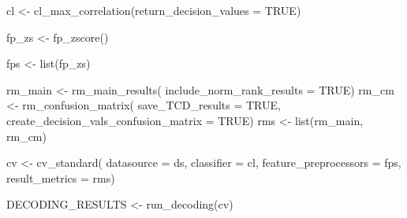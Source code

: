 \documentclass[
]{article}
\newenvironment{Shaded}{\begin{snugshade}}{\end{snugshade}}
\newcommand{\AttributeTok}[1]{\textcolor[rgb]{0.77,0.63,0.00}{#1}}
\newcommand{\ConstantTok}[1]{\textcolor[rgb]{0.00,0.00,0.00}{#1}}
\newcommand{\FunctionTok}[1]{\textcolor[rgb]{0.00,0.00,0.00}{#1}}
\newcommand{\NormalTok}[1]{#1}
\newcommand{\OtherTok}[1]{\textcolor[rgb]{0.56,0.35,0.01}{#1}}
\begin{document}
\begin{Shaded}
\begin{Highlighting}[]
\NormalTok{cl }\OtherTok{\textless{}{-}} \FunctionTok{cl\_max\_correlation}\NormalTok{(}\AttributeTok{return\_decision\_values =} \ConstantTok{TRUE}\NormalTok{) }


\NormalTok{fp\_zs }\OtherTok{\textless{}{-}} \FunctionTok{fp\_zscore}\NormalTok{()}

\NormalTok{fps }\OtherTok{\textless{}{-}} \FunctionTok{list}\NormalTok{(fp\_zs) }


\NormalTok{rm\_main }\OtherTok{\textless{}{-}} \FunctionTok{rm\_main\_results}\NormalTok{(}
     \AttributeTok{include\_norm\_rank\_results =} \ConstantTok{TRUE}\NormalTok{)}
\NormalTok{rm\_cm }\OtherTok{\textless{}{-}} \FunctionTok{rm\_confusion\_matrix}\NormalTok{(}
     \AttributeTok{save\_TCD\_results =} \ConstantTok{TRUE}\NormalTok{,}
     \AttributeTok{create\_decision\_vals\_confusion\_matrix =} \ConstantTok{TRUE}\NormalTok{)}
\NormalTok{rms }\OtherTok{\textless{}{-}} \FunctionTok{list}\NormalTok{(rm\_main, rm\_cm)}


\NormalTok{cv }\OtherTok{\textless{}{-}} \FunctionTok{cv\_standard}\NormalTok{(}
     \AttributeTok{datasource =}\NormalTok{ ds,}
     \AttributeTok{classifier =}\NormalTok{ cl, }
     \AttributeTok{feature\_preprocessors =}\NormalTok{ fps,}
     \AttributeTok{result\_metrics =}\NormalTok{ rms) }


\NormalTok{DECODING\_RESULTS }\OtherTok{\textless{}{-}} \FunctionTok{run\_decoding}\NormalTok{(cv)}
\end{Highlighting}
\end{Shaded}
\end{document}
